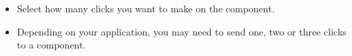 
\begin{itemize}
\item Select how many clicks you want to make on the component.
\item Depending on your application, you may need to send one, two or three clicks to a component. 
\end{itemize}

    
